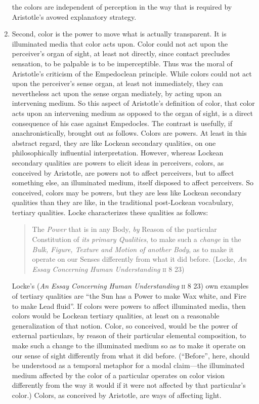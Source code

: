 \begin{enumerate}[(1)]
the colors are independent of perception in the way that is required by Aristotle's avowed explanatory strategy.
	\item Second, color is the power to move what is actually transparent. It is illuminated media that color acts upon. Color could not act upon the perceiver's organ of sight, at least not directly, since contact precludes sensation, to be palpable is to be imperceptible. Thus was the moral of Aristotle's criticism of the Empedoclean principle. While colors could not act upon the perceiver's sense organ, at least not immediately, they can nevertheless act upon the sense organ mediately, by acting upon an intervening medium. So this aspect of Aristotle's definition of color, that color acts upon an intervening medium as opposed to the organ of sight, is a direct consequence of his case against Empedocles. The contrast is usefully, if anachronistically, brought out as follows. Colors are powers. At least in this abstract regard, they are like Lockean secondary qualities, on one philosophically influential interpretation. However, whereas Lockean secondary qualities are powers to elicit ideas in perceivers, colors, as conceived by Aristotle, are powers not to affect perceivers, but to affect something else, an illuminated medium, itself disposed to affect perceivers. So conceived, colors may be powers, but they are less like Lockean secondary qualities than they are like, in the traditional post-Lockean vocabulary, tertiary qualities. Locke characterizes these qualities as follows: 
\begin{quote}
	The \emph{Power} that is in any Body, \emph{by} Reason of the particular Constitution of \emph{its primary Qualities}, to make such a \emph{change} in the \emph{Bulk, Figure, Texture and Motion of another Body}, as to make it operate on our Senses differently from what it did before. (Locke, \emph{An Essay Concerning Human Understanding} \textsc{ii} 8 23)
\end{quote}
Locke's (\emph{An Essay Concerning Human Understanding} \textsc{ii} 8 23) own examples of tertiary qualities are ``the Sun has a Power to make Wax white, and Fire to make Lead fluid''. If colors were powers to affect illuminated media, then colors would be Lockean tertiary qualities, at least on a reasonable generalization of that notion. Color, so conceived, would be the power of external particulars, by reason of their particular elemental composition, to make such a change to the illuminated medium so as to make it operate on our sense of sight differently from what it did before. (``Before'', here, should be understood as a temporal metaphor for a modal claim---the illuminated medium affected by the color of a particular operates on color vision differently from the way it would if it were not affected by that particular's color.) Colors, as conceived by Aristotle, are ways of affecting light.

\end{enumerate}
